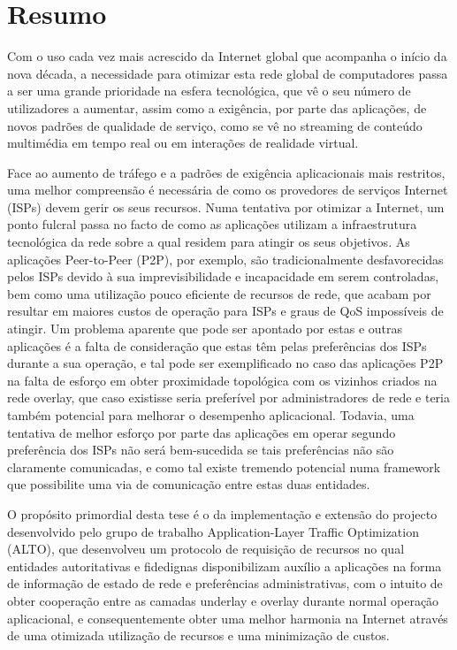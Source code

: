 \chapter{Resumo}

    Com o uso cada vez mais acrescido da Internet global que acompanha o início da nova década, a necessidade para otimizar esta rede global de computadores passa a ser uma grande prioridade na esfera tecnológica, que vê o seu número de utilizadores a aumentar, assim como a exigência, por parte das aplicações, de novos padrões de qualidade de serviço, como se vê no streaming de conteúdo multimédia em tempo real ou em interações de realidade virtual.

    Face ao aumento de tráfego e a padrões de exigência aplicacionais mais restritos, uma melhor compreensão é necessária de como os provedores de serviços Internet (ISPs) devem gerir os seus recursos.
    Numa tentativa por otimizar a Internet, um ponto fulcral passa no facto de como as aplicações utilizam a infraestrutura tecnológica da rede sobre a qual residem para atingir os seus objetivos.
    As aplicações Peer-to-Peer (P2P), por exemplo, são tradicionalmente desfavorecidas pelos ISPs devido à sua imprevisibilidade e incapacidade em serem controladas, bem como uma utilização pouco eficiente de recursos de rede, que acabam por resultar em maiores custos de operação para ISPs e graus de QoS impossíveis de atingir.
    Um problema aparente que pode ser apontado por estas e outras aplicações é a falta de consideração que estas têm pelas preferências dos ISPs durante a sua operação, e tal pode ser exemplificado no caso das aplicações P2P na falta de esforço em obter proximidade topológica com os vizinhos criados na rede overlay, que caso existisse seria preferível por administradores de rede e teria também potencial para melhorar o desempenho aplicacional.
    Todavia, uma tentativa de melhor esforço por parte das aplicações em operar segundo preferência dos ISPs não será bem-sucedida se tais preferências não são claramente comunicadas, e como tal existe tremendo potencial numa framework que possibilite uma via de comunicação entre estas duas entidades.

    O propósito primordial desta tese é o da implementação e extensão do projecto desenvolvido pelo grupo de trabalho Application-Layer Traffic Optimization (ALTO), que desenvolveu um protocolo de requisição de recursos no qual entidades autoritativas e fidedignas disponibilizam auxílio a aplicações na forma de informação de estado de rede e preferências administrativas, com o intuito de obter cooperação entre as camadas underlay e overlay durante normal operação aplicacional, e consequentemente obter uma melhor harmonia na Internet através de uma otimizada utilização de recursos e uma minimização de custos.
